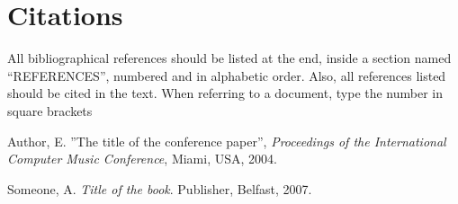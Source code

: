 \documentclass{article}
\begin{document}
\section{Citations}

All bibliographical references should be listed at the
end, inside a section named ``REFERENCES'', numbered
and in alphabetic order. Also, all
references listed should be cited in the text.
When referring to a document, type the number in
square brackets \cite{Author:00}

\begin{thebibliography}{citations}

 Author, E.
''The title of the conference paper'',
{\it Proceedings of the International Computer Music Conference}, Miami, USA, 2004.

 Someone, A.
{\it  Title of the book}.
Publisher, Belfast, 2007.

\end{thebibliography}
\end{document}
